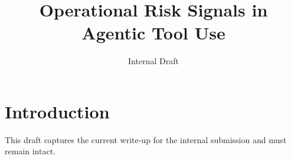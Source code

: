 \documentclass{article}
\title{Operational Risk Signals in Agentic Tool Use}
\author{Internal Draft}
\begin{document}
\maketitle
\section{Introduction}
This draft captures the current write-up for the internal submission and must remain intact.
\end{document}
